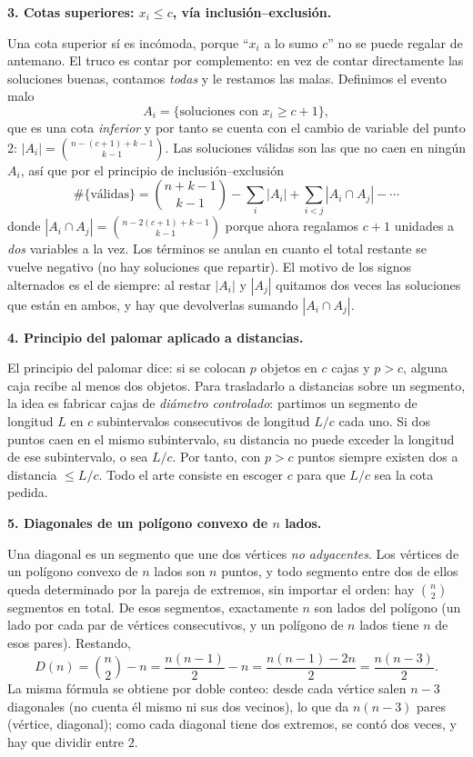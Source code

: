 \documentclass[11pt]{article}
\begin{document}
\begin{teo}
\medskip
\textbf{3. Cotas superiores: $x_i\le c$, vía inclusión--exclusión.}

Una cota superior sí es incómoda, porque ``$x_i$ a lo sumo $c$'' no se puede regalar de antemano.
El truco es contar por complemento: en vez de contar directamente las soluciones buenas, contamos
\emph{todas} y le restamos las malas. Definimos el evento malo
\[
A_i=\{\text{soluciones con } x_i\ge c+1\},
\]
que es una cota \emph{inferior} y por tanto se cuenta con el cambio de variable del punto 2:
$|A_i|=\binom{n-(c+1)+k-1}{k-1}$. Las soluciones válidas son las que no caen en ningún $A_i$, así que
por el principio de inclusión--exclusión
\[
\#\{\text{válidas}\}=\binom{n+k-1}{k-1}-\sum_i |A_i|+\sum_{i<j}|A_i\cap A_j|-\cdots
\]
donde $|A_i\cap A_j|=\binom{n-2(c+1)+k-1}{k-1}$ porque ahora regalamos $c+1$ unidades a \emph{dos}
variables a la vez. Los términos se anulan en cuanto el total restante se vuelve negativo (no hay
soluciones que repartir). El motivo de los signos alternados es el de siempre: al restar $|A_i|$ y
$|A_j|$ quitamos dos veces las soluciones que están en ambos, y hay que devolverlas sumando
$|A_i\cap A_j|$.

\medskip
\textbf{4. Principio del palomar aplicado a distancias.}

El principio del palomar dice: si se colocan $p$ objetos en $c$ cajas y $p>c$, alguna caja recibe
al menos dos objetos. Para trasladarlo a distancias sobre un segmento, la idea es fabricar cajas de
\emph{diámetro controlado}: partimos un segmento de longitud $L$ en $c$ subintervalos consecutivos de
longitud $L/c$ cada uno. Si dos puntos caen en el mismo subintervalo, su distancia no puede exceder la
longitud de ese subintervalo, o sea $L/c$. Por tanto, con $p>c$ puntos siempre existen dos a distancia
$\le L/c$. Todo el arte consiste en escoger $c$ para que $L/c$ sea la cota pedida.

\medskip
\textbf{5. Diagonales de un polígono convexo de $n$ lados.}

Una diagonal es un segmento que une dos vértices \emph{no adyacentes}. Los vértices de un polígono
convexo de $n$ lados son $n$ puntos, y todo segmento entre dos de ellos queda determinado por la
pareja de extremos, sin importar el orden: hay $\binom{n}{2}$ segmentos en total. De esos segmentos,
exactamente $n$ son lados del polígono (un lado por cada par de vértices consecutivos, y un polígono
de $n$ lados tiene $n$ de esos pares). Restando,
\[
D(n)=\binom{n}{2}-n=\frac{n(n-1)}{2}-n=\frac{n(n-1)-2n}{2}=\frac{n(n-3)}{2}.
\]
La misma fórmula se obtiene por doble conteo: desde cada vértice salen $n-3$ diagonales (no cuenta él
mismo ni sus dos vecinos), lo que da $n(n-3)$ pares (vértice, diagonal); como cada diagonal tiene dos
extremos, se contó dos veces, y hay que dividir entre $2$.
\end{teo}
\end{document}
